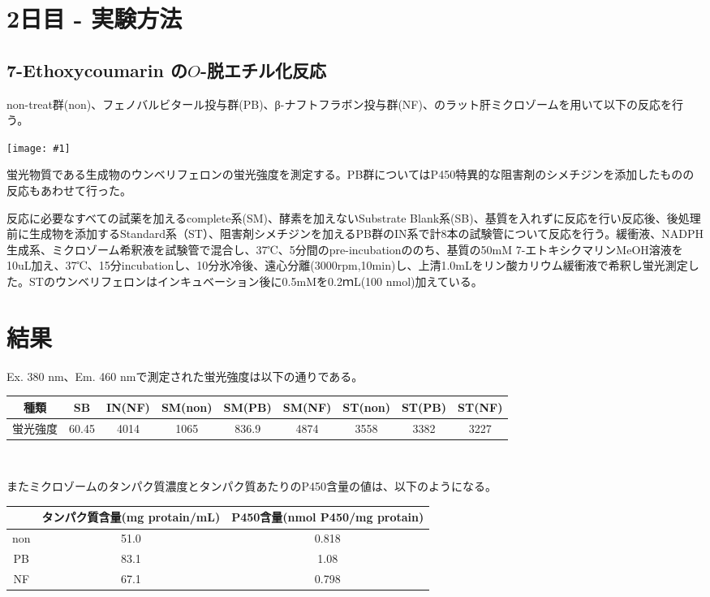 \documentclass[a4paper,papersize,dvipdfmx]{jsarticle}
\newcommand{\pict}[2]{\begin{center} \texttt{[image: \#1]} \end{center}}   %
\begin{document}
\section*{2日目 - 実験方法}
\subsection*{7-Ethoxycoumarin の$O$-脱エチル化反応}
non-treat群(non)、フェノバルビタール投与群(PB)、β-ナフトフラボン投与群(NF)、のラット肝ミクロゾームを用いて以下の反応を行う。

\pict{imgs/image1.png}{8}

蛍光物質である生成物のウンベリフェロンの蛍光強度を測定する。PB群についてはP450特異的な阻害剤のシメチジンを添加したものの反応もあわせて行った。

反応に必要なすべての試薬を加えるcomplete系(SM)、酵素を加えないSubstrate Blank系(SB)、基質を入れずに反応を行い反応後、後処理前に生成物を添加するStandard系（ST）、阻害剤シメチジンを加えるPB群のIN系で計8本の試験管について反応を行う。緩衝液、NADPH生成系、ミクロゾーム希釈液を試験管で混合し、37℃、5分間のpre-incubationののち、基質の50mM 7-エトキシクマリンMeOH溶液を10uL加え、37℃、15分incubationし、10分氷冷後、遠心分離(3000rpm,10min)し、上清1.0mLをリン酸カリウム緩衝液で希釈し蛍光測定した。STのウンベリフェロンはインキュベーション後に0.5mMを0.2ｍL(100 nmol)加えている。

\section*{結果}

Ex. 380 nm、Em. 460 nmで測定された蛍光強度は以下の通りである。

\begin{table}[H]
\begin{center}
\begin{tabular}{|c|c|c|c|c|c|c|c|c|}
\hline
種類   & SB    & IN(NF) & SM(non) & SM(PB) & SM(NF) & ST(non) & ST(PB) & ST(NF) \\ \hline
蛍光強度 & 60.45 & 4014   & 1065    & 836.9  & 4874   & 3558    & 3382   & 3227   \\ \hline
\end{tabular}
\end{center}
\end{table}

\

またミクロゾームのタンパク質濃度とタンパク質あたりのP450含量の値は、以下のようになる。

\begin{table}[H]
\begin{center}
\begin{tabular}{|c|c|c|}
\hline
& タンパク質含量(mg protain/mL) & P450含量(nmol P450/mg protain)  \\ \hline
non                    & 51.0              & 0.818       \\ \hline
PB                     & 83.1              & 1.08 		\\ \hline
NF                     & 67.1               & 0.798       \\ \hline
\end{tabular}
\end{center}
\end{table}
\end{document}
